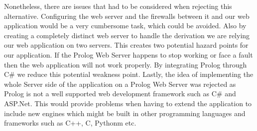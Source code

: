 Nonetheless, there are issues that had to be considered when rejecting this alternative. Configuring the web server and the firewalls between it and our web application would be a very cumbersome task, which could be avoided. Also by creating a completely distinct web server to handle the derivation we are relying our web application on two servers. This creates two potential hazard points for our application. If the Prolog Web Server happens to stop working or face a fault then the web application will not work properly. By integrating Prolog through C\# we reduce this potential weakness point. Lastly, the idea of implementing the whole Server side of the application on a Prolog Web Server was rejected as Prolog is not a well supported web development framework such as C\# and ASP.Net. This would provide problems when having to extend the application to include new engines which might be built in other programming languages and frameworks such as C++, C, Pythonm etc.